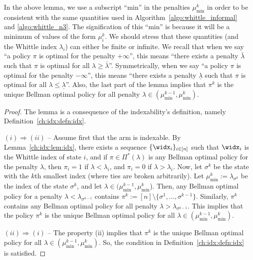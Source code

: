 In the above lemma, we use a subscript ``min'' in the penalties $\mu^{k}_{\min}$ in order to be consistent with the same quantities used in Algorithm~\ref{algo:whittle_informal} and \ref{algo:whittle_n3}.  The signification of this ``min'' is because it will be a minimum of values of the form $\mu^k_i$.
We should stress that these quantities (and the Whittle index $\lambda_i$) can either be finite or infinite.
We recall that when we say ``a policy $\pi$ is optimal for the penalty $+\infty$'', this means ``there exists a penalty $\bar{\lambda}$ such that $\pi$ is optimal for all $\lambda\ge\bar{\lambda}$''. 
Symmetrically, when we say ``a policy $\pi$ is optimal for the penalty $-\infty$'', this means ``there exists a penalty $\underline{\lambda}$ such that $\pi$ is optimal for all $\lambda\le\underline{\lambda}$''.
Also, the last part of the lemma implies that $\pi^k$ is the unique Bellman optimal policy for all penalty $\lambda\in(\mu^{k-1}_{\min}, \mu^{k}_{\min})$.

\begin{proof}
    The lemma is a consequence of the indexability's definition, namely Definition~\ref{ch:idx:defn:idx}.

    $(i)\Rightarrow(ii)$ -- Assume first that the arm is indexable.
    By Lemma~\ref{ch:idx:lem:idx}, there exists a sequence $\{\widx_i\}_{i\in[n]}$ such that $\widx_i$ is the Whittle index of state $i$, and if $\pi\in\Pi^*(\lambda)$ is any Bellman optimal policy for the penalty $\lambda$, then $\pi_i=1$ if $\lambda<\lambda_i$, and $\pi_i=0$ if $\lambda>\lambda_i$.
    Now, let $\sigma^k$ be the state with the $k$th smallest index (where ties are broken arbitrarily).
    Let $\mu^k_{\min}:=\lambda_{\sigma^k}$ be the index of the state $\sigma^k$, and let $\lambda\in(\mu^{k-1}_{\min},\mu^{k}_{\min}$).
    Then, any Bellman optimal policy for a penalty $\lambda<\lambda_{\sigma^{k-1}}$ contains $\pi^{k}:=[n]\setminus\{\sigma^1,\dots, \sigma^{k-1}\}$.
    Similarly, $\pi^{k}$ contains any Bellman optimal policy for all penalty $\lambda>\lambda_{\sigma^{k-1}}$.
    This implies that the policy $\pi^{k}$ is the unique Bellman optimal policy for all $\lambda\in(\mu^{k-1}_{\min},\mu^{k}_{\min})$. 

    $(ii)\Rightarrow(i)$ -- The property (ii) implies that $\pi^k$ is the unique Bellman optimal policy for all $\lambda\in(\mu^{k-1}_{\min},\mu^k_{\min})$. 
    So, the condition in Definition~\ref{ch:idx:defn:idx} is satisfied.
\end{proof}



